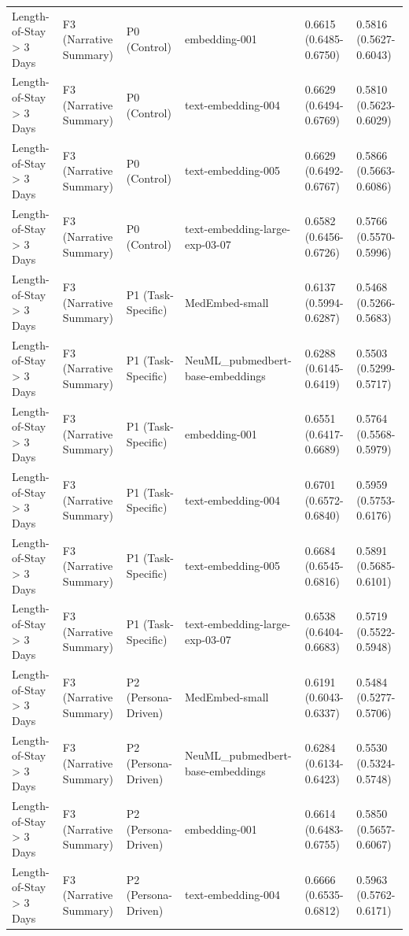 \begin{tabular}{llllll}
Length-of-Stay \textgreater{} 3 Days & F3 (Narrative Summary) & P0 (Control) & embedding-001 & 0.6615 (0.6485-0.6750) & 0.5816 (0.5627-0.6043) \\
Length-of-Stay \textgreater{} 3 Days & F3 (Narrative Summary) & P0 (Control) & text-embedding-004 & 0.6629 (0.6494-0.6769) & 0.5810 (0.5623-0.6029) \\
Length-of-Stay \textgreater{} 3 Days & F3 (Narrative Summary) & P0 (Control) & text-embedding-005 & 0.6629 (0.6492-0.6767) & 0.5866 (0.5663-0.6086) \\
Length-of-Stay \textgreater{} 3 Days & F3 (Narrative Summary) & P0 (Control) & text-embedding-large-exp-03-07 & 0.6582 (0.6456-0.6726) & 0.5766 (0.5570-0.5996) \\
Length-of-Stay \textgreater{} 3 Days & F3 (Narrative Summary) & P1 (Task-Specific) & MedEmbed-small & 0.6137 (0.5994-0.6287) & 0.5468 (0.5266-0.5683) \\
Length-of-Stay \textgreater{} 3 Days & F3 (Narrative Summary) & P1 (Task-Specific) & NeuML\_pubmedbert-base-embeddings & 0.6288 (0.6145-0.6419) & 0.5503 (0.5299-0.5717) \\
Length-of-Stay \textgreater{} 3 Days & F3 (Narrative Summary) & P1 (Task-Specific) & embedding-001 & 0.6551 (0.6417-0.6689) & 0.5764 (0.5568-0.5979) \\
Length-of-Stay \textgreater{} 3 Days & F3 (Narrative Summary) & P1 (Task-Specific) & text-embedding-004 & 0.6701 (0.6572-0.6840) & 0.5959 (0.5753-0.6176) \\
Length-of-Stay \textgreater{} 3 Days & F3 (Narrative Summary) & P1 (Task-Specific) & text-embedding-005 & 0.6684 (0.6545-0.6816) & 0.5891 (0.5685-0.6101) \\
Length-of-Stay \textgreater{} 3 Days & F3 (Narrative Summary) & P1 (Task-Specific) & text-embedding-large-exp-03-07 & 0.6538 (0.6404-0.6683) & 0.5719 (0.5522-0.5948) \\
Length-of-Stay \textgreater{} 3 Days & F3 (Narrative Summary) & P2 (Persona-Driven) & MedEmbed-small & 0.6191 (0.6043-0.6337) & 0.5484 (0.5277-0.5706) \\
Length-of-Stay \textgreater{} 3 Days & F3 (Narrative Summary) & P2 (Persona-Driven) & NeuML\_pubmedbert-base-embeddings & 0.6284 (0.6134-0.6423) & 0.5530 (0.5324-0.5748) \\
Length-of-Stay \textgreater{} 3 Days & F3 (Narrative Summary) & P2 (Persona-Driven) & embedding-001 & 0.6614 (0.6483-0.6755) & 0.5850 (0.5657-0.6067) \\
Length-of-Stay \textgreater{} 3 Days & F3 (Narrative Summary) & P2 (Persona-Driven) & text-embedding-004 & 0.6666 (0.6535-0.6812) & 0.5963 (0.5762-0.6171) \\

\end{tabular}

